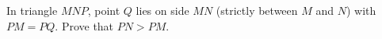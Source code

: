 In triangle $MNP$, point $Q$ lies on side $MN$ (strictly between $M$ and $N$) with $PM=PQ$. Prove that $PN>PM$.
